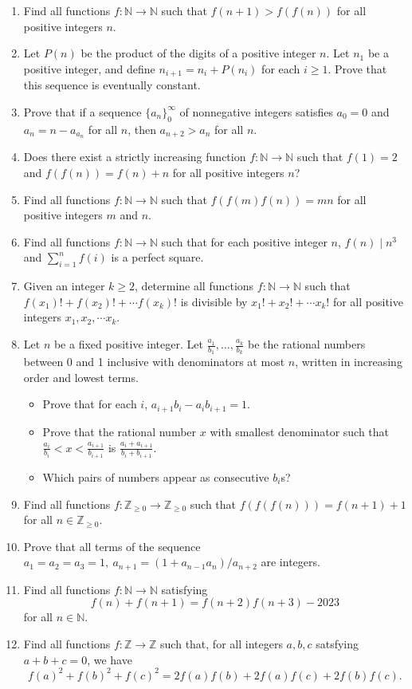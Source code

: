 \documentclass{article}
\newcommand\Nn{\mathbb{N}}
\newcommand\Zz{\mathbb{Z}}
\begin{document}
\begin{enumerate}
	\item Find all functions $f:\Nn\to\Nn$ such that $f(n+1)>f(f(n))$ for all
	      positive integers $n$.
	\item Let $P(n)$ be the product of the digits of a positive integer $n$.
	      Let $n_1$ be a positive integer, and define $n_{i+1}=n_i+P(n_i)$ for each
	      $i\ge 1$. Prove that this sequence is eventually constant.
	\item Prove that if a sequence $\{a_n\}_0^\infty$ of nonnegative integers satisfies
	      $a_0=0$ and $a_n=n-a_{a_n}$ for all $n$, then $a_{n+2}>a_n$ for all $n$.
	\item Does there exist a strictly increasing function $f:\Nn\to\Nn$ such that
	      $f(1)=2$ and $f(f(n))=f(n)+n$ for all positive integers $n$?
	\item Find all functions $f:\Nn\to\Nn$ such that $f(f(m)f(n))=mn$ for all
	      positive integers $m$ and $n$.
	\item Find all functions $f:\mathbb N\to\mathbb N$ such that for each positive
	      integer $n$, $f(n)\mid n^3$ and $\displaystyle\sum_{i=1}^n f(i)$ is a perfect
	      square.
	\item Given an integer $k\geq 2$, determine all functions $f:\Nn\to\Nn$
	      such that $f(x_1)!+f(x_2)!+\cdots f(x_k)!$
	      is divisible by $x_1!+x_2!+\cdots x_k!$ for all positive integers
	      $x_1,x_2,\cdots x_k$.
	\item Let $n$ be a fixed positive integer. Let
	      $\frac{a_1}{b_1},\ldots,\frac{a_k}{b_k}$ be the rational numbers between 0
	      and 1 inclusive with denominators at most $n$, written in increasing order
	      and lowest terms.
	      \begin{itemize}
		      \item Prove that for each $i$, $a_{i+1}b_i-a_i b_{i+1}=1$.
		      \item Prove that the rational number $x$ with smallest denominator such
		            that $\frac{a_i}{b_i}<x<\frac{a_{i+1}}{b_{i+1}}$ is
		            $\frac{a_i+a_{i+1}}{b_i+b_{i+1}}$.
		      \item Which pairs of numbers appear as consecutive $b_i$s?
	      \end{itemize}
	\item Find all functions $f:\Zz_{\ge 0}\to \Zz_{\ge 0}$ such that
	      $f(f(f(n)))=f(n+1)+1$ for all $n\in\Zz_{\ge 0}$.
	\item Prove that all terms of the sequence $a_1=a_2=a_3=1,\
		      a_{n+1}=(1+a_{n-1}a_n)/a_{n+2}$ are integers.
	\item Find all functions $f:\mathbb N\to\mathbb N$ satisfying
	      \[f(n)+f(n+1)=f(n+2)f(n+3)-2023\]
	      for all $n\in\mathbb N$.
	\item Find all functions $f:\Zz\to\Zz$ such that, for all integers $a,b,c$
	      satsfying $a+b+c=0$, we have
	      \[f(a)^2+f(b)^2+f(c)^2=2f(a)f(b)+2f(a)f(c)+2f(b)f(c).\]
\end{enumerate}
\newpage
\end{document}

